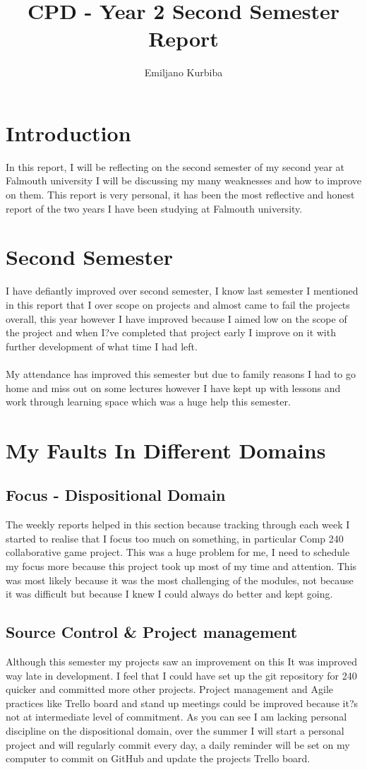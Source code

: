 \documentclass[10pt,a4paper]{report}
\author{Emiljano Kurbiba}
\title{CPD - Year 2 Second Semester Report}
\begin{document}
	\section*{Introduction}
	In this report, I will be reflecting on the second semester of my second year at Falmouth university I will be discussing my many weaknesses and how to improve on them. This report is very personal, it has been the most reflective and honest report of the two years I have been studying at Falmouth university. 
	
	\section*{Second Semester}
	I have defiantly improved over second semester, I know last semester I mentioned in this report that I over scope on projects and almost came to fail the projects overall, this year however I have improved because I aimed low on the scope of the project and when I?ve completed that project early I improve on it with further development of what time I had left.\\\\
	My attendance has improved this semester but due to family reasons I had to go home and miss out on some lectures however I have kept up with lessons and work through learning space which was a huge help this semester.
	
	\section*{My Faults In Different Domains}
	\subsection*{Focus - Dispositional Domain}
	The weekly reports helped in this section because tracking through each week I started to realise that I focus too much on something, in particular Comp 240 collaborative game project. This was a huge problem for me, I need to schedule my focus more because this project took up most of my time and attention. This was most likely because it was the most challenging of the modules, not because it was difficult but because I knew I could always do better and kept going. 
	
	\subsection*{Source Control \& Project management}
	Although this semester my projects saw an improvement on this It was improved way late in development. I feel that I could have set up the git repository for 240 quicker and committed more other projects. Project management and Agile practices like Trello board and stand up meetings could be improved because it?s not at intermediate level of commitment. 
	As you can see I am lacking personal discipline on the dispositional domain, over the summer I will start a personal project and will regularly commit every day, a daily reminder will be set on my computer to commit on GitHub and update the projects Trello board.
	
\end{document}
